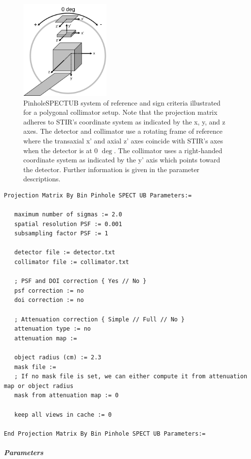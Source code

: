 \documentclass{article}
\newcommand{\subsubsubsubsection}[1]{\subparagraph{#1} \mbox{} \\}
\begin{document}
{{\begin{figure}[htbp]
\begin{center}
\includegraphics[height=5cm]{graphics/STIR-UsersGuide_PinholeSPECTUB}
\caption{PinholeSPECTUB system of reference and sign criteria illustrated for a polygonal collimator setup. Note that the projection matrix adheres to STIR's coordinate system as indicated by the x, y, and z axes. The detector and collimator use a rotating frame of reference where the transaxial x' and axial z' axes coincide with STIR's axes when the detector is at 0 $\mathrm{\deg}$. The collimator uses a right-handed coordinate system as indicated by the y' axis which points toward the detector. Further information is given in the parameter descriptions.}
\label{PinholeSPECTUB_coords}
\end{center}
\end{figure}

\begin{verbatim}
Projection Matrix By Bin Pinhole SPECT UB Parameters:=

   maximum number of sigmas := 2.0
   spatial resolution PSF := 0.001
   subsampling factor PSF := 1
   
   detector file := detector.txt
   collimator file := collimator.txt

   ; PSF and DOI correction { Yes // No }
   psf correction := no
   doi correction := no
   
   ; Attenuation correction { Simple // Full // No }
   attenuation type := no
   attenuation map :=
   
   object radius (cm) := 2.3
   mask file := 
   ; If no mask file is set, we can either compute it from attenuation map or object radius
   mask from attenuation map := 0
   
   keep all views in cache := 0

End Projection Matrix By Bin Pinhole SPECT UB Parameters:=
\end{verbatim}

{ \subsubsubsubsection{Parameters} }
\begin{description}


\end{description}}}
\end{document}
